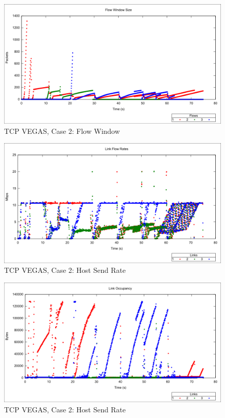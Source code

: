 \begin{figure}[htbp]
    \centering
    \includegraphics[width=\textwidth]{vegas2/Flow_Window.png}
    \caption{TCP VEGAS, Case 2: Flow Window}
\end{figure}


\begin{figure}[htbp]
    \centering
    \includegraphics[width=\textwidth]{vegas2/Link_Flow_Rate.png}
    \caption{TCP VEGAS, Case 2: Host Send Rate}
\end{figure}

\begin{figure}[htbp]
    \centering
    \includegraphics[width=\textwidth]{vegas2/Link_Occupancy.png}
    \caption{TCP VEGAS, Case 2: Host Send Rate}
\end{figure}


